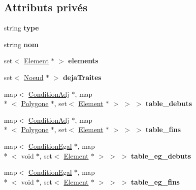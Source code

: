 \subsection*{Attributs privés}
\begin{DoxyCompactItemize}
\item 
\hypertarget{class_regle_sequence_aefc0acf54c76f95a15080df4996ce296}{string {\bfseries type}}\label{class_regle_sequence_aefc0acf54c76f95a15080df4996ce296}

\item 
\hypertarget{class_regle_sequence_ab57ac6215025b673691010b0a2a57b87}{string {\bfseries nom}}\label{class_regle_sequence_ab57ac6215025b673691010b0a2a57b87}

\item 
\hypertarget{class_regle_sequence_af43a1ef4bd41eba1ad989831df6831cf}{set$<$ \hyperlink{class_element}{Element} $\ast$ $>$ {\bfseries elements}}\label{class_regle_sequence_af43a1ef4bd41eba1ad989831df6831cf}

\item 
\hypertarget{class_regle_sequence_aa3dbd3a9d1d025918a4cd38e4ae2505c}{set$<$ \hyperlink{class_noeud}{Noeud} $\ast$ $>$ {\bfseries deja\-Traites}}\label{class_regle_sequence_aa3dbd3a9d1d025918a4cd38e4ae2505c}

\item 
\hypertarget{class_regle_sequence_ac76b51a73c43c3122b43f0782e3d3355}{map$<$ \hyperlink{class_condition_adj}{Condition\-Adj} $\ast$, map\\*
$<$ \hyperlink{class_polygone}{Polygone} $\ast$, set$<$ \hyperlink{class_element}{Element} $\ast$ $>$ $>$ $>$ {\bfseries table\-\_\-debuts}}\label{class_regle_sequence_ac76b51a73c43c3122b43f0782e3d3355}

\item 
\hypertarget{class_regle_sequence_a57b2f9884234276fa004d006a60b7653}{map$<$ \hyperlink{class_condition_adj}{Condition\-Adj} $\ast$, map\\*
$<$ \hyperlink{class_polygone}{Polygone} $\ast$, set$<$ \hyperlink{class_element}{Element} $\ast$ $>$ $>$ $>$ {\bfseries table\-\_\-fins}}\label{class_regle_sequence_a57b2f9884234276fa004d006a60b7653}

\item 
\hypertarget{class_regle_sequence_a6fc2e70a5a7715ebd8058f77f9f52eb8}{map$<$ \hyperlink{class_condition_egal}{Condition\-Egal} $\ast$, map\\*
$<$ void $\ast$, set$<$ \hyperlink{class_element}{Element} $\ast$ $>$ $>$ $>$ {\bfseries table\-\_\-eg\-\_\-debuts}}\label{class_regle_sequence_a6fc2e70a5a7715ebd8058f77f9f52eb8}

\item 
\hypertarget{class_regle_sequence_ae4af3c30ff37df35b459ce338c7293c9}{map$<$ \hyperlink{class_condition_egal}{Condition\-Egal} $\ast$, map\\*
$<$ void $\ast$, set$<$ \hyperlink{class_element}{Element} $\ast$ $>$ $>$ $>$ {\bfseries table\-\_\-eg\-\_\-fins}}\label{class_regle_sequence_ae4af3c30ff37df35b459ce338c7293c9}

\end{DoxyCompactItemize}


